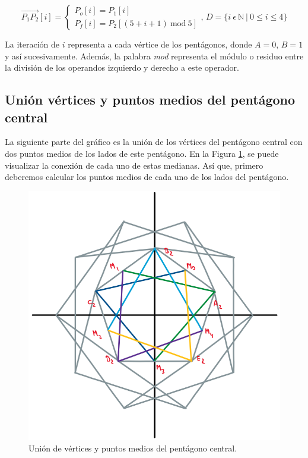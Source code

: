 \documentclass[oneside, a4paper]{article}
\begin{document}
            \begin{equation}
                \overrightarrow{P_{1}P_{2}}[i] =
                \begin{cases}
                    P_{o}[i] = P_{1}[i] \\
                    P_{f}[i] = P_{2}[(5 + i + 1) \: \textrm{mod} \: 5]
                \end{cases}
                \textrm{, } D = \{ i \: \epsilon \: \mathbb{N} \: | \: 0 \leqslant i \leqslant 4 \}
                \label{eq:union2_vertices_internal_external_pentagon}
            \end{equation}

            La iteración de $i$ representa a cada vértice de los pentágonos, donde $A = 0$, $B = 1$ y así sucesivamente. Además, la palabra \textit{mod} representa el módulo o residuo entre la división de los operandos izquierdo y derecho a este operador.

        \subsection{Unión vértices y puntos medios del pentágono central}
            La siguiente parte del gráfico es la unión de los vértices del pentágono central con dos puntos medios de los lados de este pentágono. En la Figura \ref{fig:vertex_to_median_connection}, se puede visualizar la conexión de cada uno de estas medianas. Así que, primero deberemos calcular los puntos medios de cada uno de los lados del pentágono.

            \begin{figure}[H]
                \centering
                \includegraphics[scale=0.5]{vertex_to_median_connection.png}
                \caption{Unión de vértices y puntos medios del pentágono central.}
                \label{fig:vertex_to_median_connection}
            \end{figure}
\end{document}
